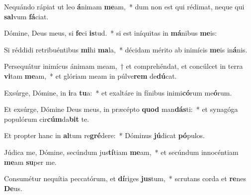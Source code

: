 \item Nequándo rápiat ut leo \textbf{á}nimam \textbf{me}am,~* dum non est qui rédimat, neque qui \textbf{sal}vum \textbf{fá}ciat.
\item Dómine, Deus meus, si \textbf{fe}ci \textbf{is}tud.~* si est iníquitas in \textbf{má}nibus \textbf{me}is:
\item Si réddidi retribuéntibus \textbf{mi}hi \textbf{ma}la,~* décidam mérito ab inimícis \textbf{me}is in\textbf{á}nis.
\item Persequátur inimícus ánimam meam,~† et comprehéndat, et concúlcet in terra \textbf{vi}tam \textbf{me}am,~* et glóriam meam in púlve\textbf{rem} de\textbf{dú}cat.
\item Exsúrge, Dómine, in \textbf{i}ra \textbf{tu}a:~* et exaltáre in fínibus inimi\textbf{có}rum me\textbf{ó}rum.
\item Et exsúrge, Dómine Deus meus, in præcépto \textbf{quod} man\textbf{dás}ti:~* et synagóga populórum cir\textbf{cúm}da\textbf{bit} te.
\item Et propter hanc in \textbf{al}tum re\textbf{gré}dere:~* Dóminus \textbf{jú}dicat \textbf{pó}pulos.
\item Júdica me, Dómine, secúndum jus\textbf{tí}tiam \textbf{me}am,~* et secúndum innocéntiam \textbf{me}am \textbf{su}per me.
\item Consumétur nequítia peccatórum, et \textbf{dí}riges \textbf{jus}tum,~* scrutans corda et \textbf{re}nes \textbf{De}us.
